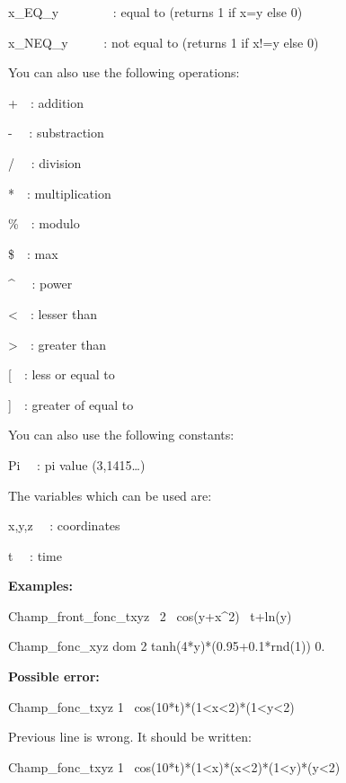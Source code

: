 x\_EQ\_y \ \ \ \ \ \ \ \ : equal to (returns 1 if x=y else 0)

x\_NEQ\_y \ \ \ \ \ : not equal to (returns 1 if x!=y else 0) 


\bigskip

You can also use the following operations:

+\ \ : addition

{}- \ \ : substraction

/ \ \ : division

*\ \ : multiplication

\%\ \ : modulo

\$\ \ : max

\^{} \ \ : power

{\textless}\ \ : lesser than

{\textgreater}\ \ : greater than

[\ \ : less or equal to

]\ \ : greater of equal to


\bigskip

You can also use the following constants:

Pi \ \ : pi value (3,1415{\dots})


\bigskip

The variables which can be used are:

x,y,z \ \ : coordinates 

t \ \ : time


\bigskip

{\bfseries
Examples:}

Champ\_front\_fonc\_txyz \ 2 \ cos(y+x\^{}2) \ t+ln(y)

Champ\_fonc\_xyz dom 2 tanh(4*y)*(0.95+0.1*rnd(1)) 0.


\bigskip

{\bfseries
Possible error:}

Champ\_fonc\_txyz 1 \ cos(10*t)*(1{\textless}x{\textless}2)*(1{\textless}y{\textless}2)

Previous line is wrong. It should be written:

Champ\_fonc\_txyz 1 \ cos(10*t)*(1{\textless}x)*(x{\textless}2)*(1{\textless}y)*(y{\textless}2)
